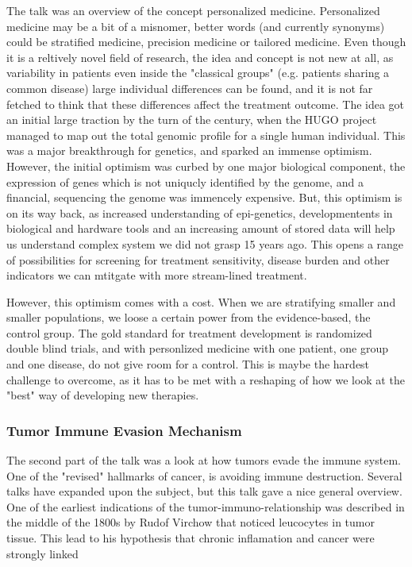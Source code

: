\documentclass[12p]{article}
\begin{document}
The talk was an overview of the concept personalized medicine.
Personalized medicine may be a bit of a misnomer, better words (and currently synonyms) could be stratified medicine, precision medicine or tailored medicine.
Even though it is a reltively novel field of research, the idea and concept is not new at all, as variability in patients even inside the "classical groups" (e.g. patients sharing a common disease) large individual differences can be found, and it is not far fetched to think that these differences affect the treatment outcome.
The idea got an initial large traction by the turn of the century, when the HUGO project managed to map out the total genomic profile for a single human individual.
This was a major breakthrough for genetics, and sparked an immense optimism.
However, the initial optimism was curbed by one major biological component, the expression of genes which is not uniqucly identified by the genome, and a financial, sequencing the genome was immencely expensive.
But, this optimism is on its way back, as increased understanding of epi-genetics, developmentents in biological and hardware tools and an increasing amount of stored data will help us understand complex system we did not grasp 15 years ago.
This opens a range of possibilities for screening for treatment sensitivity, disease burden and other indicators we can mtitgate with more stream-lined treatment.

However, this optimism comes with a cost.
When we are stratifying smaller and smaller populations, we loose a certain power from the evidence-based, the control group.
The gold standard for treatment development is randomized double blind trials, and with personlized medicine with one patient, one group and one disease, do not give room for a control.
This is maybe the hardest challenge to overcome, as it has to be met with a reshaping of how we look at the "best" way of developing new therapies.

\subsubsection{Tumor Immune Evasion Mechanism}

The second part of the talk was a look at how tumors evade the immune system.
One of the "revised" hallmarks of cancer, is avoiding immune destruction.
Several talks have expanded upon the subject, but this talk gave a nice general overview.
One of the earliest indications of the tumor-immuno-relationship was described in the middle of the 1800s by Rudof Virchow that noticed leucocytes in tumor tissue.
This lead to his hypothesis that chronic inflamation and cancer were strongly linked 
\end{document}
